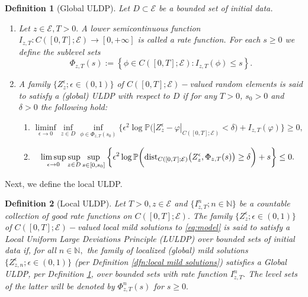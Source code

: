 \documentclass[10pt, reqno]{amsart}
\newcommand{\N}{\mathbb{N}}
\newcommand{\pr}{\mathbb{P}}
\newcommand{\e}{\mathcal{E}}
\newtheorem{dfn}{Definition}
\theoremstyle{definition}
\numberwithin{lem}{section}
\numberwithin{cor}{section}
\numberwithin{prop}{section}
\numberwithin{thm}{section}
\numberwithin{dfn}{section}
\begin{document}
        \begin{dfn}[Global ULDP]\label{Def:GlobalULDP} Let $D\subset\e$ be a bounded set of initial data. 
        \begin{enumerate}
                  \item[1.] 
                Let  $z\in\e,T>0.$
        A lower semicontinuous function $I_{z,T}:C([0,T];\e) \to [0,+\infty]$ is called a rate function. For each $s\geq 0$ we define the sublevel sets       \begin{equation}%
        \label{eq:SublevelSets}
             \Phi_{z,T}(s) := \left\{\phi \in C([0,T];\e): I_{z,T}(\phi) \leq s \right\}.
         \end{equation}
         \item[2.] A family $\{Z_z^\epsilon; \epsilon\in(0,1)\}$ of $C([0,T];\e)-$valued random elements is said to satisfy a (global) ULDP with respect to $D$ if for any $T>0$, $s_0>0$ and $\delta>0$ the following hold: \begin{enumerate}
                  \item 
                  \begin{equation} %
                  \label{eq:LULDP-lower}
                      \liminf_{\epsilon \to 0} \inf_{z \in D} \inf_{\phi \in \Phi_{z,T}(s_0)} \bigg\{\epsilon^2 \log \pr\bigg(|Z^{\epsilon}_z - \varphi|_{C([0,T];\e)}<\delta\bigg) + I_{z,T}(\varphi) \bigg\} \geq 0,
                  \end{equation}
                  \item 
                  \begin{equation} %
                  \label{eq:LULDP-upper}
                      \limsup_{\epsilon \to 0} \sup_{z \in D} \sup_{s \in [0,s_0]} \bigg\{\epsilon^2\log \pr \bigg(\textnormal{dist}_{C([0,T];\e)}\big(Z^\epsilon_z, \Phi_{z,T}(s) \big)\geq\delta\bigg) + s \bigg\} \leq 0.
                  \end{equation}
              \end{enumerate}

\end{enumerate}
      
             \end{dfn}

        

Next, we define the local ULDP. 
       \begin{dfn}[Local ULDP] \label{Def:LocalULDP} Let $T>0, z\in\e$ and $\{I^n_{z,T};n\in\N\}$ be a countable collection of good rate functions on $C([0,T];\e).$ The family $\{Z_z^\epsilon; \epsilon\in(0,1)\}$ of $C([0,T];\e)-$valued local mild solutions to \eqref{eq:model}  is said to satisfy a Local Uniform Large Deviations Principle (LULDP) over bounded sets of initial data if, for all $n\in\N,$ the family of localized (global) mild solutions  $\{Z^{\epsilon}_{z,n}; \epsilon\in(0,1)\}$ (per Definition \ref{dfn:local mild solutions}) satisfies a Global ULDP, per Definition \ref{Def:GlobalULDP}, over bounded sets with rate function $I^n_{z,T}.$ The level sets of the latter will be denoted by $\Phi^n_{z,T}(s)$ for $s\geq 0.$
\end{dfn}
\end{document}
